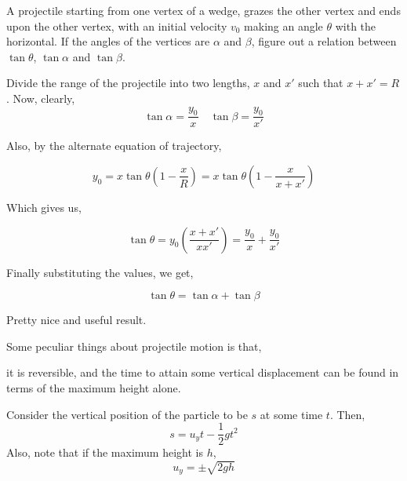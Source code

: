 \begin{example}
    A projectile starting from one vertex of a wedge, grazes the other 
    vertex and ends upon the other vertex, with an initial velocity 
    \(v_0\) making an angle \(\theta\) with the horizontal. If the
    angles of the vertices are \(\alpha\) and \(\beta\), figure 
    out a relation between \(\tan \theta\), \(\tan\alpha\) and \(\tan\beta\).

    \begin{soln}
        Divide the range of the projectile into two lengths, \(x\) and 
        \(x'\) such that \(x + x' = R\). Now, clearly, 
        \begin{equation*}
            \tan\alpha = \frac{y_0}{x} \quad \tan\beta = \frac{y_0}{x'}
        \end{equation*}

        Also, by the alternate equation of trajectory,

        \begin{equation*}
            y_0 = x\tan\theta\left(1 - \frac{x}{R}\right) = x\tan\theta\left(1 - \frac{x}{x + x'}\right) 
        \end{equation*}

        Which gives us, 

        \begin{equation*}
            \tan\theta = y_0 \left(\frac{x + x'}{xx'}\right) = \frac{y_0}{x} + \frac{y_0}{x'}
        \end{equation*}

        Finally substituting the values, we get, 

        \begin{equation}
            \tan\theta = \tan\alpha + \tan\beta
        \end{equation}
        
        Pretty nice and useful result.

    \end{soln}
\end{example}


Some peculiar things about projectile motion is that, \begin{inparaenum}[a)]
    \ii it is reversible, and
    \ii the time to attain some vertical displacement can be found in terms of 
    the maximum height alone.
\end{inparaenum}

Consider the vertical position of the particle to be 
\(s\) at some time \(t\). Then, 
\[s = u_yt - \frac{1}{2}gt^2\] 
Also, note that if the maximum height is \(h\), 
\[u_y = \pm \sqrt{2gh}\]

